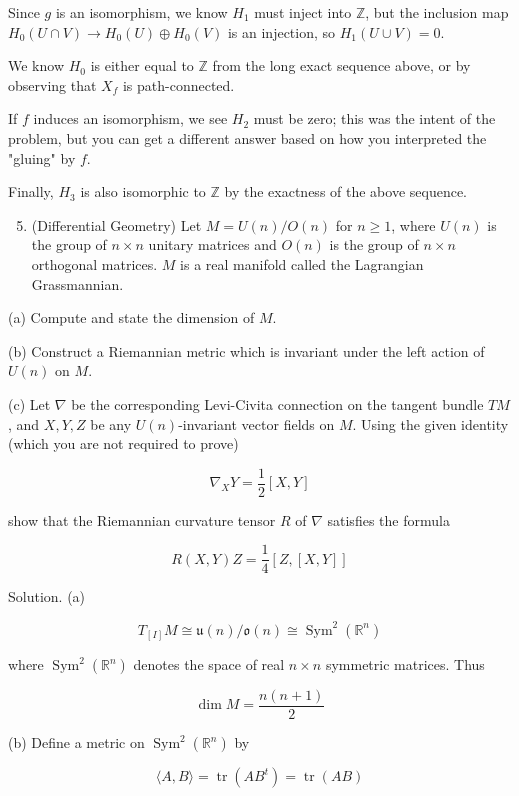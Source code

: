 \documentclass[10pt]{article}
\begin{document}
Since $g$ is an isomorphism, we know $H_{1}$ must inject into $\mathbb{Z}$, but the inclusion map $H_{0}(U \cap V) \rightarrow H_{0}(U) \oplus H_{0}(V)$ is an injection, so $H_{1}(U \cup V)=0$.

We know $H_{0}$ is either equal to $\mathbb{Z}$ from the long exact sequence above, or by observing that $X_{f}$ is path-connected.

If $f$ induces an isomorphism, we see $H_{2}$ must be zero; this was the intent of the problem, but you can get a different answer based on how you interpreted the "gluing" by $f$.

Finally, $H_{3}$ is also isomorphic to $\mathbb{Z}$ by the exactness of the above sequence.

\begin{enumerate}
  \setcounter{enumi}{4}
  \item (Differential Geometry) Let $M=U(n) / O(n)$ for $n \geq 1$, where $U(n)$ is the group of $n \times n$ unitary matrices and $O(n)$ is the group of $n \times n$ orthogonal matrices. $M$ is a real manifold called the Lagrangian Grassmannian.
\end{enumerate}

(a) Compute and state the dimension of $M$.

(b) Construct a Riemannian metric which is invariant under the left action of $U(n)$ on $M$.

(c) Let $\nabla$ be the corresponding Levi-Civita connection on the tangent bundle $T M$, and $X, Y, Z$ be any $U(n)$-invariant vector fields on $M$. Using the given identity (which you are not required to prove)

$$
\nabla_{X} Y=\frac{1}{2}[X, Y]
$$

show that the Riemannian curvature tensor $R$ of $\nabla$ satisfies the formula

$$
R(X, Y) Z=\frac{1}{4}[Z,[X, Y]]
$$

Solution. (a)

$$
T_{[I]} M \cong \mathfrak{u}(n) / \mathfrak{o}(n) \cong \operatorname{Sym}^{2}\left(\mathbb{R}^{n}\right)
$$

where $\operatorname{Sym}^{2}\left(\mathbb{R}^{n}\right)$ denotes the space of real $n \times n$ symmetric matrices. Thus

$$
\operatorname{dim} M=\frac{n(n+1)}{2}
$$

(b) Define a metric on $\operatorname{Sym}^{2}\left(\mathbb{R}^{n}\right)$ by

$$
\langle A, B\rangle=\operatorname{tr}\left(A B^{t}\right)=\operatorname{tr}(A B)
$$
\end{document}
